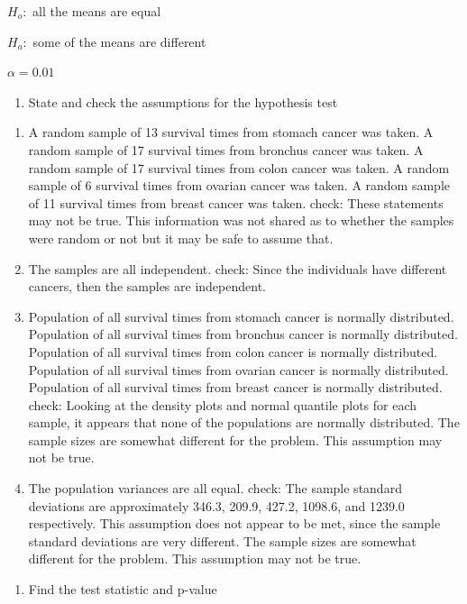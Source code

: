 \documentclass[
]{book}
\providecommand{\tightlist}{%
  \setlength{\itemsep}{0pt}\setlength{\parskip}{0pt}}
\begin{document}
\(H_o:\) all the means are equal

\(H_a:\) some of the means are different

\(\alpha=0.01\)

\begin{enumerate}
\def\labelenumi{\arabic{enumi}.}
\setcounter{enumi}{2}
\tightlist
\item
  State and check the assumptions for the hypothesis test
\end{enumerate}

\begin{enumerate}
\def\labelenumi{\alph{enumi}.}
\item
  A random sample of 13 survival times from stomach cancer was taken. A random sample of 17 survival times from bronchus cancer was taken. A random sample of 17 survival times from colon cancer was taken. A random sample of 6 survival times from ovarian cancer was taken. A random sample of 11 survival times from breast cancer was taken. check: These statements may not be true. This information was not shared as to whether the samples were random or not but it may be safe to assume that.
\item
  The samples are all independent. check: Since the individuals have different cancers, then the samples are independent.
\item
  Population of all survival times from stomach cancer is normally distributed. Population of all survival times from bronchus cancer is normally distributed. Population of all survival times from colon cancer is normally distributed. Population of all survival times from ovarian cancer is normally distributed. Population of all survival times from breast cancer is normally distributed. check: Looking at the density plots and normal quantile plots for each sample, it appears that none of the populations are normally distributed. The sample sizes are somewhat different for the problem. This assumption may not be true.
\item
  The population variances are all equal. check: The sample standard deviations are approximately 346.3, 209.9, 427.2, 1098.6, and 1239.0 respectively. This assumption does not appear to be met, since the sample standard deviations are very different. The sample sizes are somewhat different for the problem. This assumption may not be true.
\end{enumerate}

\begin{enumerate}
\def\labelenumi{\arabic{enumi}.}
\setcounter{enumi}{3}
\tightlist
\item
  Find the test statistic and p-value
\end{enumerate}
\end{document}
